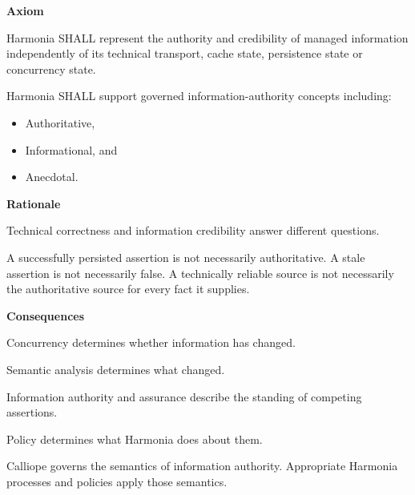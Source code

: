 \par\medskip\textbf{Axiom}\par


Harmonia SHALL represent the authority and credibility of managed
information independently of its technical transport, cache state,
persistence state or concurrency state.



Harmonia SHALL support governed information-authority concepts including:



\begin{itemize}


\item Authoritative,

\item Informational, and

\item Anecdotal.

\end{itemize}


\par\medskip\textbf{Rationale}\par


Technical correctness and information credibility answer different
questions.



A successfully persisted assertion is not necessarily authoritative. A
stale assertion is not necessarily false. A technically reliable source
is not necessarily the authoritative source for every fact it supplies.



\par\medskip\textbf{Consequences}\par


Concurrency determines whether information has changed.



Semantic analysis determines what changed.



Information authority and assurance describe the standing of competing
assertions.



Policy determines what Harmonia does about them.



Calliope governs the semantics of information authority. Appropriate
Harmonia processes and policies apply those semantics.



